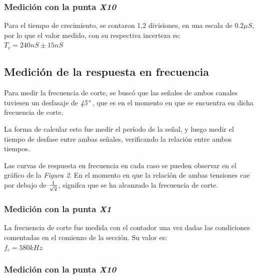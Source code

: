 \documentclass{article}
\begin{document}
\subsubsection{Medición con la punta \textit{X10}} 

	Para el tiempo de crecimiento, se contaron 1,2 divisiones, en una escala de $0.2 \mu S$, por lo que el valor medido, con su respectiva incerteza es: \\

$T_c = 240 nS \pm 15 nS$\\
\bigskip\bigskip



\subsection{Medición de la respuesta en frecuencia}
	
	Para medir la frecuencia de corte, se buscó que las señales de ambos canales tuviesen un desfasaje de \textit{45°} , que es en el momento en que se encuentra en dicha frecuencia de corte.
	\par
	La forma de calcular esto fue medir el período de la señal, y luego medir el tiempo de desfase entre ambas señales, verificando la relación entre ambos tiempos.
	\par
	Las curvas de respuesta en frecuencia en cada caso se pueden observar en el gráfico de la \textit{Figura 2}. En el momento en que la relación de ambas tensiones cae por debajo de ${1 \over \sqrt{2}}$, signifca que se ha alcanzado la frecuencia de corte.
\bigskip



\subsubsection{Medición con la punta \textit{X1}}

	La frecuencia de corte fue medida con el contador una vez dadas las condiciones comentadas en el comienzo de la sección. Su valor es: \\

$f_c = 580 kHz$
\bigskip



\subsubsection{Medición con la punta \textit{X10}}
\end{document}
